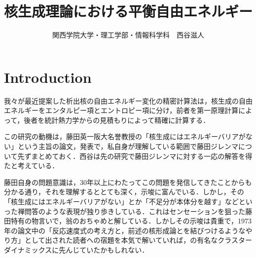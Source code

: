 \documentclass[a4j,10pt]{jarticle}
\begin{document}
\title{核生成理論における平衡自由エネルギー}
\author{関西学院大学・理工学部・情報科学科　西谷滋人 
}

\maketitle

\section{Introduction}
我々が最近提案した析出核の自由エネルギー変化の精密計算法は，核生成の自由エネルギーをエンタルピー項とエントロピー項に分け，前者を第一原理計算によって，後者を統計熱力学からの見積もりによって精確に計算する．

この研究の動機は，藤田英一阪大名誉教授の「核生成にはエネルギーバリアがない」という主旨の論文，発表で，私自身が理解している範囲で藤田ジレンマについて先ずまとめておく．西谷は先の研究で藤田ジレンマに対する一応の解答を得たと考えている．

藤田自身の問題意識は，30年以上にわたってこの問題を発信してきたことからも分かる通り，それを理解するととても深く，示唆に富んでいる．しかし，その「核生成にはエネルギーバリアがない」とか「不足分が本体分を越す」などといった禅問答のような表現が独り歩きしている．これはセンセーションを狙った藤田特有の物言いで，翁のおちゃめと解している．しかしその示唆は貴重で，1973年の論文中\cite{Fujita:1973}の「反応速度式の考え方と，前述の核形成論とを結びつけるようなやり方」として出された読者への宿題を本気で解いていれば，\cite{BinderStauffer:1976}の有名なクラスターダイナミックスに先んじていたかもしれない．
\end{document}
